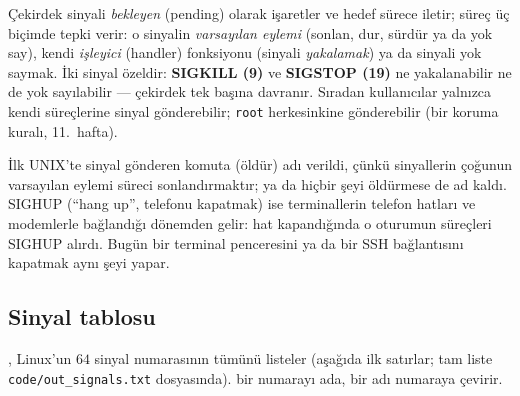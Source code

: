 Çekirdek sinyali \emph{bekleyen} (pending) olarak işaretler ve hedef sürece iletir; süreç üç biçimde tepki verir: o sinyalin \emph{varsayılan eylemi} (sonlan, dur, sürdür ya da yok say), kendi \emph{işleyici} (handler) fonksiyonu (sinyali \emph{yakalamak}) ya da sinyali yok saymak. İki sinyal özeldir: \textbf{SIGKILL (9)} ve \textbf{SIGSTOP (19)} ne yakalanabilir ne de yok sayılabilir --- çekirdek tek başına davranır. Sıradan kullanıcılar yalnızca kendi süreçlerine sinyal gönderebilir; \texttt{root} herkesinkine gönderebilir (bir koruma kuralı, 11.~hafta).

\begin{histnote}
İlk UNIX'te sinyal gönderen komuta  (öldür) adı verildi, çünkü sinyallerin çoğunun varsayılan eylemi süreci sonlandırmaktır;  ya da  hiçbir şeyi öldürmese de ad kaldı. SIGHUP (``hang up'', telefonu kapatmak) ise terminallerin telefon hatları ve modemlerle bağlandığı dönemden gelir: hat kapandığında o oturumun süreçleri SIGHUP alırdı. Bugün bir terminal penceresini ya da bir SSH bağlantısını kapatmak aynı şeyi yapar.
\end{histnote}

\subsection{Sinyal tablosu}
\label{sec:sigtable}

, Linux'un $64$ sinyal numarasının tümünü listeler (aşağıda ilk satırlar; tam liste \texttt{code/\allowbreak out\_signals.txt} dosyasında).  bir numarayı ada,  bir adı numaraya çevirir.



